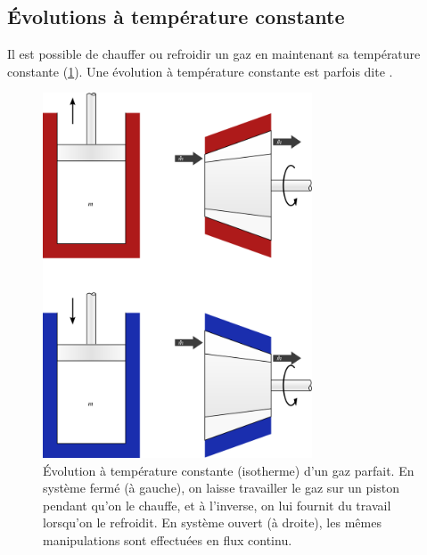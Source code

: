 	\subsection{Évolutions à température constante}
	\label{ch_gp_isothermes}
	
		Il est possible de chauffer ou refroidir un gaz en maintenant sa température constante (\cref{fig_gp_température_constante}). Une évolution à température constante est parfois dite . 
		
		\begin{figure}
			\begin{center}
				\includegraphics[width=8cm]{images/temperature_constante.png}
			\end{center}
			\caption{Évolution à température constante (isotherme) d’un gaz parfait. En système fermé (à gauche), on laisse travailler le gaz sur un piston pendant qu’on le chauffe, et à l’inverse, on lui fournit du travail lorsqu’on le refroidit. En système ouvert (à droite), les mêmes manipulations sont effectuées en flux continu.}
			\label{fig_gp_température_constante}
		\end{figure}
		
